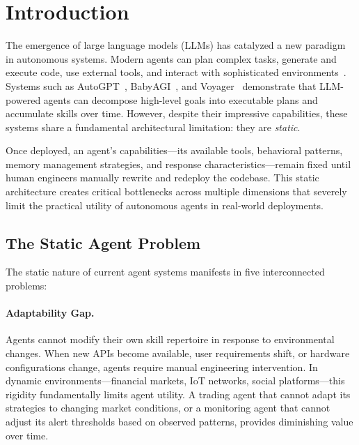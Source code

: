 \documentclass{article}
\begin{document}

\section{Introduction}
\label{sec:introduction}

The emergence of large language models (LLMs) has catalyzed a new paradigm in autonomous systems. Modern agents can plan complex tasks, generate and execute code, use external tools, and interact with sophisticated environments~\cite{wang2023survey, xi2023rise}. Systems such as AutoGPT~\cite{auto_gpt}, BabyAGI~\cite{babyagi}, and Voyager~\cite{wang2023voyager} demonstrate that LLM-powered agents can decompose high-level goals into executable plans and accumulate skills over time. However, despite their impressive capabilities, these systems share a fundamental architectural limitation: they are \textit{static}.

Once deployed, an agent's capabilities—its available tools, behavioral patterns, memory management strategies, and response characteristics—remain fixed until human engineers manually rewrite and redeploy the codebase. This static architecture creates critical bottlenecks across multiple dimensions that severely limit the practical utility of autonomous agents in real-world deployments.

\subsection{The Static Agent Problem}

The static nature of current agent systems manifests in five interconnected problems:

\paragraph{Adaptability Gap.} Agents cannot modify their own skill repertoire in response to environmental changes. When new APIs become available, user requirements shift, or hardware configurations change, agents require manual engineering intervention. In dynamic environments—financial markets, IoT networks, social platforms—this rigidity fundamentally limits agent utility. A trading agent that cannot adapt its strategies to changing market conditions, or a monitoring agent that cannot adjust its alert thresholds based on observed patterns, provides diminishing value over time.
\end{document}
